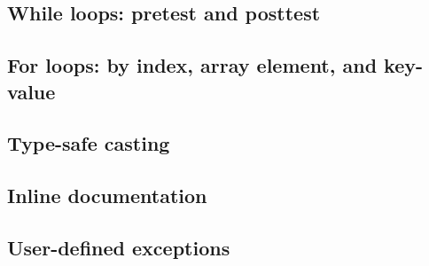 \documentclass{article}
\theoremstyle{definition}
\begin{document}
\hypertarget{hsec:whileloops}{}
\subsection{While loops: pretest and posttest}
\label{sec:whileloops}


\hypertarget{hsec:forloops}{}
\subsection{For loops: by index, array element, and key-value}
\label{sec:forloops}


\hypertarget{hsec:casting}{}
\subsection{Type-safe casting}
\label{sec:casting}


\hypertarget{hsec:inline-doc}{}
\subsection{Inline documentation}
\label{sec:inline-doc}


\hypertarget{hsec:exception-form}{}
\subsection{User-defined exceptions}
\label{sec:exception-form}
\end{document}
